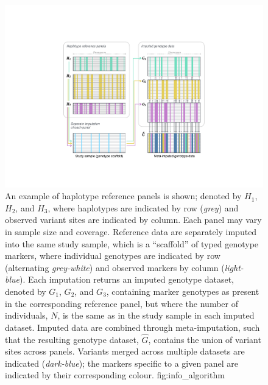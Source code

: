 

\begin{figure}[!htb]
\includegraphics[width=\textwidth]{./img/ch2/info_algorithm}
{An example of  haplotype reference panels is shown; denoted by $H_1$, $H_2$, and $H_3$, where haplotypes are indicated by row (\emph{grey}) and observed variant sites are indicated by column.
Each panel may vary in sample size and coverage.
Reference data are separately imputed into the same study sample, which is a ``scaffold'' of typed genotype markers, where individual genotypes are indicated by row (alternating \emph{grey-white}) and observed markers by column (\emph{light-blue}).
Each imputation returns an imputed genotype dataset, denoted by $G_1$, $G_2$, and $G_3$, containing marker genotypes as present in the corresponding reference panel, but where the number of individuals, $N$, is the same as in the study sample in each imputed dataset.
Imputed data are combined through meta-imputation, such that the resulting genotype dataset, $\hat{G}$, contains the union of variant sites across panels.
Variants merged across multiple datasets are indicated (\emph{dark-blue}); the markers specific to a given panel are indicated by their corresponding colour.}
{fig:info_algorithm}
\end{figure}
